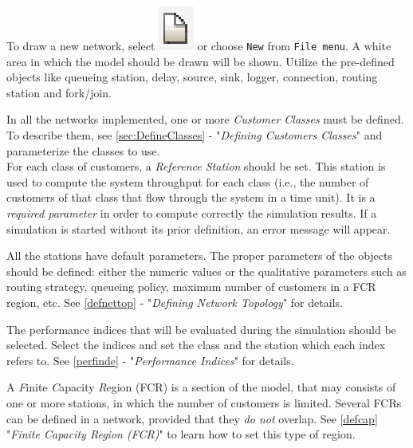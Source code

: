 
To draw a new network, select
\includegraphics[scale=.5]{img/jsimg/new.eps} or choose
\texttt{New} from \texttt{File menu}.  A white area in which the
model should be drawn will be shown. Utilize the pre-defined objects
like queueing station, delay,
source, sink, logger, connection, routing station and fork/join.


In all the networks implemented, one or more \emph{Customer Classes} must
be defined. To describe them, see \autoref{sec:DefineClasses} -
"\emph{Defining Customers Classes}" and parameterize the classes to use.\\
For each class of customers, a \emph{Reference Station} should be
set. This station is used to compute the system throughput for
each class (i.e., the number of customers of that class that flow
through the system in a time unit). It is a \emph{required
parameter} in order to compute correctly the simulation results.
If a simulation is started without its prior definition, an error
message will appear.


All the stations have default parameters. The proper parameters of
the objects should be defined: either the numeric values or the
qualitative parameters such as routing strategy, queueing policy,
maximum number of customers in a FCR region, etc. See
\autoref{defnettop} - "\emph{Defining Network Topology}" for
details.


The performance indices that will be evaluated during the
simulation should be selected. Select the indices and set the
class and the station which each index refers to. See
\autoref{perfinde} - "\emph{Performance Indices}" for details.


A \emph{F}inite \emph{C}apacity \emph{R}egion (FCR) is a section
of the model, that may consists of one or more stations, in which
the number of customers is limited. Several FCRs can be defined in
a network, provided that they \emph{do not} overlap. See
\autoref{defcap} "\emph{Finite Capacity Region (FCR)}" to
learn how to set this type of region.


